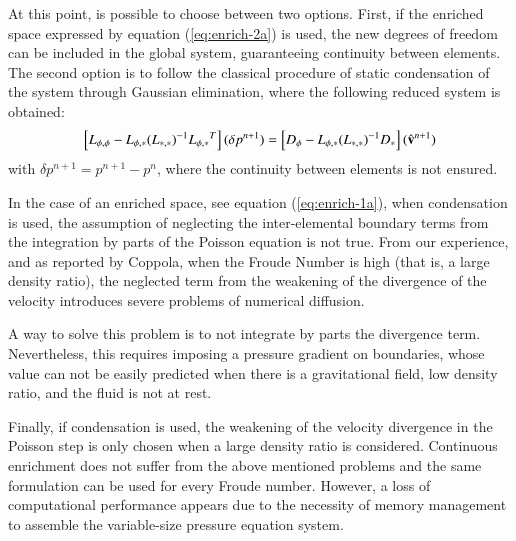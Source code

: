 At this point, is possible to choose between two options. First, if the enriched space expressed by equation (\ref{eq:enrich-2a}) is used, the new degrees of freedom can be included in the global system, guaranteeing continuity between elements. The second option is to follow the classical procedure of static condensation of the system through Gaussian elimination\cite{Felippa04}, where the following reduced system is obtained:
  \begin{equation}
   \left[L_{\phi,\phi} - L_{\phi,*}{(L_{*,*})}^{-1}{L_{\phi,*}}^T\right](\delta p^{n+1}) = \left[D_{\phi}- L_{\phi,*}{(L_{*,*})}^{-1}D_{*}\right](\hat{\mathbf{v}}^{n+1})
   \label{condensing}
  \end{equation}
with $\delta p^{n+1} = p^{n+1}-p^{n}$, where the continuity between elements is not ensured.


In the case of an enriched space, see equation (\ref{eq:enrich-1a}), when condensation is used, the assumption of neglecting the inter-elemental boundary terms from the integration by parts of the Poisson equation is not true. From our experience, and as reported by Coppola\cite{Coppola05}, when the Froude Number is high (that is, a large density ratio), the neglected term from the weakening of the divergence of the velocity introduces severe problems of numerical diffusion.

A way to solve this problem is to not integrate by parts the divergence term. Nevertheless, this requires imposing a pressure gradient on boundaries, whose value can not be easily predicted when there is a gravitational field, low density ratio, and the fluid is not at rest.

Finally, if condensation is used, the weakening of the velocity divergence in the Poisson step is only chosen when a large density ratio is considered. Continuous enrichment does not suffer from the above mentioned problems and the same formulation can be used for every Froude number. However, a loss of computational performance appears due to the necessity of memory management to assemble the variable-size pressure equation system.


%


